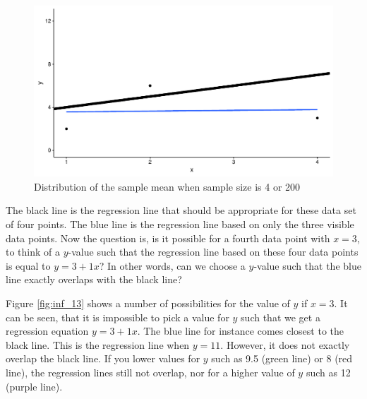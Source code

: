 \documentclass[]{book}\usepackage[]{graphicx}\usepackage[]{color}
\makeatletter
\def\maxwidth{ %
  \ifdim\Gin@nat@width>\linewidth
    \linewidth
  \else
    \Gin@nat@width
  \fi
}
\newenvironment{knitrout}{}{} %
\makeatother
\begin{document}
\begin{knitrout}
\color{fgcolor}\begin{figure}

{\centering \includegraphics[width=\maxwidth]{figure/inf_12-1} 

}

\caption[Distribution of the sample mean when sample size is 4 or 200]{Distribution of the sample mean when sample size is 4 or 200}\label{fig:inf_12}
\end{figure}


\end{knitrout}

The black line is the regression line that should be appropriate for these data set of four points. The blue line is the regression line based on only the three visible data points. Now the question is, is it possible for a fourth data point with $x=3$, to think of a $y$-value such that the regression line based on these four data points is equal to $y=3+1x$? In other words, can we choose a $y$-value such that the blue line exactly overlaps with the black line?

Figure \ref{fig:inf_13} shows a number of possibilities for the value of $y$ if $x=3$. It can be seen, that it is impossible to pick a value for $y$ such that we get a regression equation $y=3+1x$. The blue line for instance comes closest to the black line. This is the regression line when $y=11$. However, it does not exactly overlap the black line. If you lower values for $y$ such as 9.5 (green line) or 8 (red line), the regression lines still not overlap, nor for a higher value of $y$ such as 12 (purple line).
\end{document}
